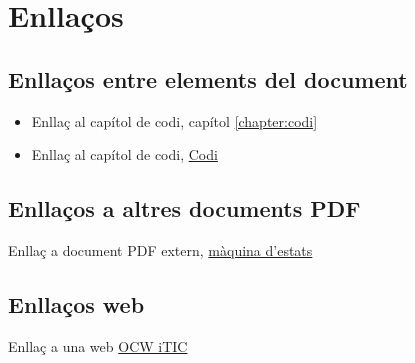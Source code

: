 \chapter{Enllaços}
\section{Enllaços entre elements del document}
\begin{itemize}
\item Enllaç al capítol de codi, capítol \ref{chapter:codi}
\item Enllaç al capítol de codi, \href{chapter:codi}{Codi}
\end{itemize}

\section{Enllaços a altres documents PDF}
Enllaç a document PDF extern, \href{graf}{màquina d'estats}

\section{Enllaços web}
Enllaç a una web \href{ocw.itic.cat}{OCW iTIC}
